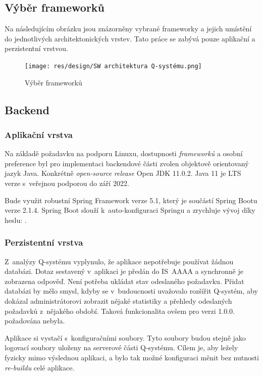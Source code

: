 \documentclass[thesis=M,czech]{FITthesis}[2019/12/23]
\begin{document}
\subsection{Výběr frameworků}
Na následujícím obrázku jsou znázorněny vybrané frameworky a jejich umístění do jednotlivých architektonických vrstev. Tato práce se zabývá pouze aplikační a perzistentní vrstvou.

\begin{figure}[H]
  \centering
  \texttt{[image: res/design/SW architektura Q-systému.png]}
  \caption{Výběr frameworků}
  \label{fig:Výběr frameworků}
\end{figure}

\subsection{Backend}
\subsubsection{Aplikační vrstva}
Na základě požadavku na podporu Linuxu, dostupnosti \textit{frameworků} a osobní preference byl pro implementaci backendové části zvolen objektově orientovaný jazyk Java. 
Konkrétně \textit{open-source} \textit{release} Open JDK 11.0.2. Java 11 je LTS verze s~veřejnou podporou do září 2022. \cite{JavaHistory, OpenJDK}

Bude využit robustní Spring Framework verze 5.1, který je součástí Spring Bootu verze 2.1.4. Spring Boot slouží k~auto-konfiguraci Springu a zrychluje vývoj díky heslu: .

\subsubsection{Perzistentní vrstva}
Z~analýzy Q-systému vyplynulo, že aplikace nepotřebuje používat žádnou databázi. Dotaz sestavený v~aplikaci je předán do IS~AAAA a synchronně je zobrazena odpověď. Není potřeba ukládat stav odeslaného požadavku. Přidat databázi by mělo smysl, kdyby se v~budoucnosti uvažovalo rozšířit Q-systém, aby dokázal administrátorovi zobrazit nějaké statistiky a přehledy odeslaných požadavků z~nějakého období. Taková funkcionalita ovšem pro verzi 1.0.0. požadována nebyla.

Aplikace si vystačí s~konfiguračními soubory. Tyto soubory budou stejně jako logovací soubory uloženy na serverové části Q-systému. Cílem je, aby ležely fyzicky mimo výslednou aplikaci, a bylo tak možné konfiguraci měnit bez nutnosti \textit{re-buildu} celé aplikace.
\end{document}

